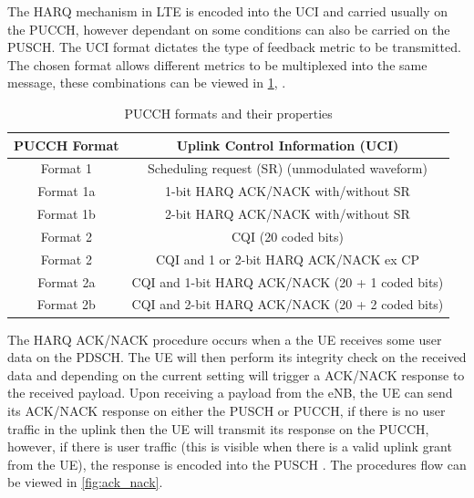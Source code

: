 \documentclass{article}
\begin{document}
The HARQ mechanism in LTE is encoded into the UCI and carried usually on the PUCCH, however dependant on some conditions can also be carried on the PUSCH. The UCI format dictates the type of feedback metric to be transmitted. The chosen format allows different metrics to be multiplexed into the same message, these combinations can be viewed in \cref{tab:pucch_formats}, \cite[Section 17.3.1.2]{umts_sesia}. 

\begin{table}[H]
\centering
\begin{tabular}{||c| c||} 
\hline
PUCCH Format & Uplink Control Information (UCI) \\ [0.1ex] 
\hline\hline
Format 1 & Scheduling request (SR) (unmodulated waveform)\\ 
\hline
Format 1a & 1-bit HARQ ACK/NACK with/without SR\\
\hline
Format 1b & 2-bit HARQ ACK/NACK with/without SR\\
\hline
Format 2 &  CQI (20 coded bits)\\
\hline
Format 2 & CQI and 1 or 2-bit HARQ ACK/NACK ex CP\\
\hline
Format 2a & CQI and 1-bit HARQ ACK/NACK (20 + 1 coded bits)\\
\hline
Format 2b & CQI and 2-bit HARQ ACK/NACK (20 + 2 coded bits)\\
\hline
\end{tabular}
\caption{PUCCH formats and their properties}
\label{tab:pucch_formats}
\end{table}


The HARQ ACK/NACK procedure occurs when a the UE receives some user data on the PDSCH. The UE will then perform its integrity check on the received data and depending on the current setting will trigger a ACK/NACK response to the received payload. Upon receiving a payload from the eNB, the UE can send its ACK/NACK response on either the PUSCH or PUCCH, if there is no user traffic in the uplink then the UE will transmit its response on the PUCCH, however, if there is user traffic (this is visible when there is a valid uplink grant from the UE), the response is encoded into the PUSCH \cite[Section 11.4]{lte_advaned_mobile}. The procedures flow can be viewed in \cref{fig:ack_nack}. 
\end{document}
